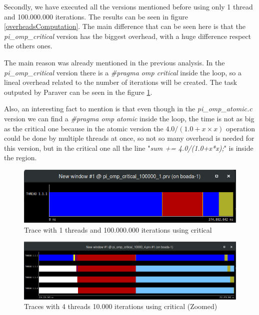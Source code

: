 \documentclass[12]{article}
\begin{document}
Secondly, we have executed all the versions mentioned before using only 1 thread and 100.000.000 iterations. The results can be seen in figure \ref{overheadsComputation}. The main difference that can be seen here is that the \textit{pi\_omp\_critical} version has the biggest overhead, with a huge difference respect the others ones.

The main reason was already mentioned in the previous analysis. In the \textit{pi\_omp\_critical} version there is a \textit{\#pragma omp critical} inside the loop, so a lineal overhead related to the number of iterations will be created. The task outputed by Paraver can be seen in the figure \ref{paraverCritical1}. 

Also, an interesting fact to mention is that even though in the \textit{pi\_omp\_atomic.c} version we can find  a \textit{\#pragma omp atomic} inside the loop, the time is not as big as the critical one because in the atomic version the $4.0/(1.0+x\times x)$ operation could be done by multiple threads at once, so not so many overhead is needed for this version, but in the critical one all the line "\textit{sum += 4.0/(1.0+x*x);}" is inside the region. 

\begin{figure}[H]
\centering
\includegraphics[scale=0.55]{images/paraverCritical1.png}
\caption{Trace with 1 threads and 100.000.000 iterations using critical}
\label{paraverCritical1}
\end{figure}


\begin{figure}[H]
\centering
\includegraphics[scale=0.35]{images/paraverCritical.png}
\caption{Traces with 4 threads 10.000 iterations using critical (Zoomed)}
\label{paraverCritical}
\end{figure}
\end{document}
